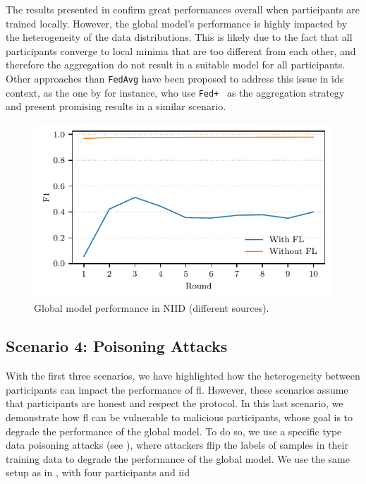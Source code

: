 The results presented in  confirm great performances overall when participants are trained locally. 
However, the global model's performance is highly impacted by the heterogeneity of the data distributions.
This is likely due to the fact that all participants converge to local minima that are too different from each other, and therefore the aggregation do not result in a suitable model for all participants.
Other approaches than \texttt{FedAvg} have been proposed to address this issue in \gls{ids} context, as the one by \textcite{popoola_FederatedDeepLearning_2021} for instance, who use \texttt{Fed+}~\cite{kundu_RobustnessPersonalizationFederated_2022a} as the aggregation strategy and present promising results in a similar scenario.

\begin{figure}
    \centering
    \includegraphics{figures/heterogeneous.pdf}
    \caption{Global model performance in NIID (different sources).}
    \label{fig:heterogeneous}
\end{figure}


\subsection{Scenario 4: Poisoning Attacks\label{sec:app.demo.poisoning}}

With the first three scenarios, we have highlighted how the heterogeneity between participants can impact the performance of \gls{fl}.
However, these scenarios assume that participants are honest and respect the protocol.
In this last scenario, we demonstrate how \gls{fl} can be vulnerable to malicious participants, whose goal is to degrade the performance of the global model.
To do so, we use a specific type data poisoning attacks (see ), where attackers flip the labels of samples in their training data to degrade the performance of the global model.
We use the same setup as in , with four participants and \gls{iid} 

